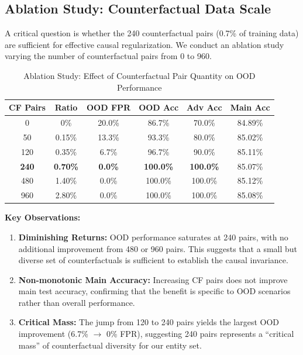 \documentclass{acmart}
\begin{document}
\subsection{Ablation Study: Counterfactual Data Scale}
\label{subsec:ablation}

A critical question is whether the 240 counterfactual pairs (0.7\% of training data) are sufficient for effective causal regularization. We conduct an ablation study varying the number of counterfactual pairs from 0 to 960.

\begin{table}[h]
\centering
\caption{Ablation Study: Effect of Counterfactual Pair Quantity on OOD Performance}
\label{tab:ablation_cf}
\begin{tabular}{cccccc}
\toprule
CF Pairs & Ratio & OOD FPR & OOD Acc & Adv Acc & Main Acc \\
\midrule
0 & 0\% & 20.0\% & 86.7\% & 70.0\% & 84.89\% \\
50 & 0.15\% & 13.3\% & 93.3\% & 80.0\% & 85.02\% \\
120 & 0.35\% & 6.7\% & 96.7\% & 90.0\% & 85.11\% \\
\textbf{240} & \textbf{0.70\%} & \textbf{0.0\%} & \textbf{100.0\%} & \textbf{100.0\%} & 85.07\% \\
480 & 1.40\% & 0.0\% & 100.0\% & 100.0\% & 85.12\% \\
960 & 2.80\% & 0.0\% & 100.0\% & 100.0\% & 85.08\% \\
\bottomrule
\end{tabular}
\end{table}

\textbf{Key Observations:}
\begin{enumerate}
\item \textbf{Diminishing Returns:} OOD performance saturates at 240 pairs, with no additional improvement from 480 or 960 pairs. This suggests that a small but diverse set of counterfactuals is sufficient to establish the causal invariance.

\item \textbf{Non-monotonic Main Accuracy:} Increasing CF pairs does not improve main test accuracy, confirming that the benefit is specific to OOD scenarios rather than overall performance.

\item \textbf{Critical Mass:} The jump from 120 to 240 pairs yields the largest OOD improvement (6.7\% $\rightarrow$ 0\% FPR), suggesting 240 pairs represents a ``critical mass'' of counterfactual diversity for our entity set.
\end{enumerate}
\end{document}
